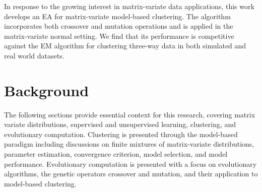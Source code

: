 \documentclass[12pt]{report}
\begin{document}
In response to the growing interest in matrix-variate data applications, this work develops an EA for matrix-variate model-based clustering. The algorithm incorporates both crossover and mutation operations and is applied in the matrix-variate normal setting. We find that its performance is competitive against the EM algorithm for clustering three-way data in both simulated and real world datasets.   






\chapter{Background}
The following sections provide essential context for this research, covering matrix variate distributions, supervised and unsupervised learning, clustering, and evolutionary computation. Clustering is presented through the model-based paradigm including discussions on finite mixtures of matrix-variate distributions, parameter estimation, convergence criterion, model selection, and model performance. Evolutionary computation is presented with a focus on evolutionary algorithms, the genetic operators crossover and mutation, and their application to model-based clustering. 



\end{document}
